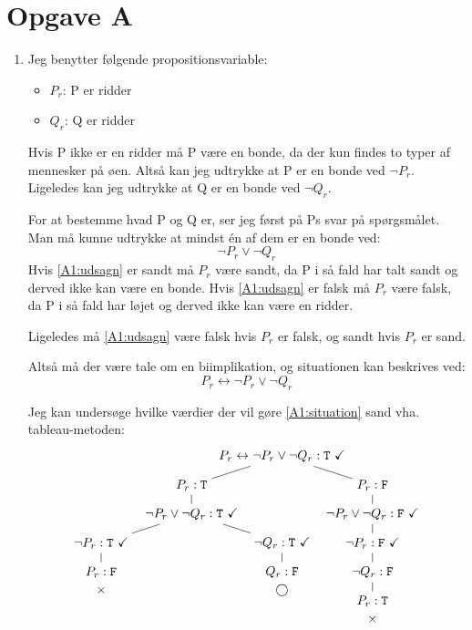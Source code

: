 \section*{Opgave A}
\begin{enumerate}
  \item
  Jeg benytter følgende propositionsvariable:
  \begin{itemize}
    \item $P_r$: P er ridder
    \item $Q_r$: Q er ridder
  \end{itemize}
  Hvis P ikke er en ridder må P være en bonde, da der kun findes to typer af mennesker på øen. Altså kan jeg udtrykke at P er en bonde ved $\lnot P_r$. Ligeledes kan jeg udtrykke at Q er en bonde ved $\lnot Q_r$.

  For at bestemme hvad P og Q er, ser jeg først på Ps svar på spørgsmålet. Man må kunne udtrykke at mindst én af dem er en bonde ved:
  \begin{equation}
    \label{A1:udsagn}
    \lnot P_r \lor \lnot Q_r
  \end{equation}
  Hvis \eqref{A1:udsagn} er sandt må $P_r$ være sandt, da P i så fald har talt sandt og derved ikke kan være en bonde. Hvis \eqref{A1:udsagn} er falsk må $P_r$ være falsk, da P i så fald har løjet og derved ikke kan være en ridder.

  Ligeledes må \eqref{A1:udsagn} være falsk hvis $P_r$ er falsk, og sandt hvis $P_r$ er sand.

  Altså må der være tale om en biimplikation, og situationen kan beskrives ved:
  \begin{equation}
    \label{A1:situation}
    P_r \leftrightarrow \lnot P_r \lor \lnot Q_r
  \end{equation}

  Jeg kan undersøge hvilke værdier der vil gøre \eqref{A1:situation} sand vha. tableau-metoden:
  \begin{equation*}
    \begin{tikzpicture}[level distance=8mm,sibling distance=50mm]
      \node {$P_r \leftrightarrow \lnot P_r \lor \lnot Q_r : \T\ \checkmark$}
      child {
        node {$P_r : \T$}
        child {
          node {$\lnot P_r \lor \lnot Q_r : \T\ \checkmark$}
          child {
            node {$\lnot P_r : \T\ \checkmark$}
            child {
              node {$P_r : \F$}
              \closed
            }
          }
          child {
            node {$\lnot Q_r : \T\ \checkmark$}
            child {
              node {$Q_r : \F$}
              \open
            }
          }
        }
      }
      child {
        node {$P_r : \F$}
        child {
          node {$\lnot P_r \lor \lnot Q_r : \F\ \checkmark$}
          child {
            node {$\lnot P_r : \F\ \checkmark$}
            child {
              node {$\lnot Q_r : \F$}
              child {
                node {$P_r : \T$}
                \closed
              }
            }
          }
        }
      };
    \end{tikzpicture}
  \end{equation*}


\end{enumerate}
